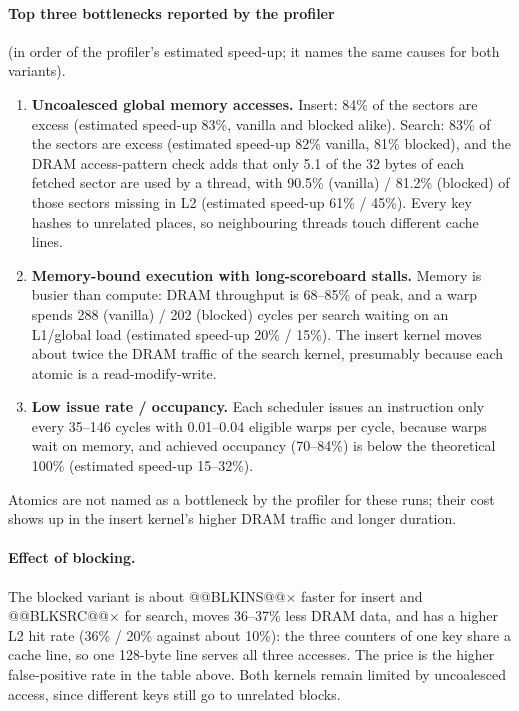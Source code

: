 \documentclass[11pt]{article}
\begin{document}
\paragraph{Top three bottlenecks reported by the profiler} (in order of the
profiler's estimated speed-up; it names the same causes for both variants).
\begin{enumerate}
\item \textbf{Uncoalesced global memory accesses.} Insert: 84\% of the
 sectors are excess (estimated speed-up 83\%, vanilla and blocked alike).
 Search: 83\% of the sectors are excess (estimated speed-up 82\% vanilla,
 81\% blocked), and the DRAM access-pattern check adds that only 5.1 of the 32
 bytes of each fetched sector are used by a thread, with 90.5\% (vanilla) /
 81.2\% (blocked) of those sectors missing in L2 (estimated speed-up 61\% /
 45\%). Every key hashes to unrelated places, so neighbouring threads touch
 different cache lines.
\item \textbf{Memory-bound execution with long-scoreboard stalls.} Memory is
 busier than compute: DRAM throughput is 68--85\% of peak, and a warp spends
 288 (vanilla) / 202 (blocked) cycles per search waiting on an L1/global load
 (estimated speed-up 20\% / 15\%). The insert kernel moves about twice the
 DRAM traffic of the search kernel, presumably because each atomic is a
 read-modify-write.
\item \textbf{Low issue rate / occupancy.} Each scheduler issues an
 instruction only every 35--146 cycles with 0.01--0.04 eligible warps per cycle,
 because warps wait on memory, and achieved occupancy (70--84\%) is below the
 theoretical 100\% (estimated speed-up 15--32\%).
\end{enumerate}
Atomics are not named as a bottleneck by the profiler for these runs; their
cost shows up in the insert kernel's higher DRAM traffic and longer duration.

\paragraph{Effect of blocking.} The blocked variant is about @@BLKINS@@$\times$ faster
for insert and @@BLKSRC@@$\times$ for search, moves 36--37\% less DRAM data, and has a
higher L2 hit rate (36\% / 20\% against about 10\%): the three counters of one
key share a cache line, so one 128-byte line serves all three accesses. The
price is the higher false-positive rate in the table above. Both kernels remain
limited by uncoalesced access, since different keys still go to unrelated
blocks.
\end{document}
